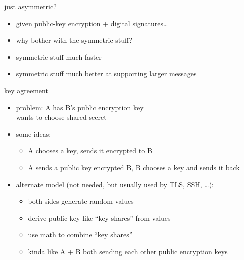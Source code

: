 \begin{frame}{just asymmetric?}
    \begin{itemize}
    \item given public-key encryption + digital signatures\ldots
    \item why bother with the symmetric stuff?
    \vspace{.5cm}
    \item symmetric stuff much faster
    \item symmetric stuff much better at supporting larger messages
    \end{itemize}
\end{frame}

\begin{frame}{key agreement}
    \begin{itemize}
    \item problem: A has B's public encryption key \\
        wants to choose shared secret 
    \vspace{.5cm}
    \item some ideas:
        \begin{itemize}
        \item A chooses a key, sends it encrypted to B
        \item A sends a public key encrypted B, B chooses a key and sends it back
        \end{itemize}
    \item<2-> alternate model (not needed, but usually used by TLS, SSH, \ldots):
        \begin{itemize}
        \item both sides generate random values
        \item derive public-key like ``key shares'' from values
        \item use math to combine ``key shares''
        \item kinda like A + B both sending each other public encryption keys
        \end{itemize}
    \end{itemize}
\end{frame}

